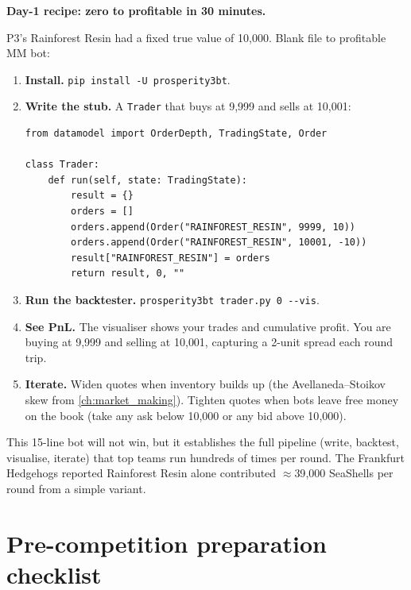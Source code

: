 \begin{prosperitybox}
\textbf{Day-1 recipe: zero to profitable in 30 minutes.}

P3's Rainforest Resin had a fixed true value of 10{,}000.  Blank file
to profitable MM bot:

\begin{enumerate}
  \item \textbf{Install.} \texttt{pip install -U prosperity3bt}.
  \item \textbf{Write the stub.}  A \texttt{Trader} that buys at 9{,}999
  and sells at 10{,}001:
\begin{lstlisting}[numbers=none, frame=none,
  backgroundcolor=\color{orange!5}]
from datamodel import OrderDepth, TradingState, Order

class Trader:
    def run(self, state: TradingState):
        result = {}
        orders = []
        orders.append(Order("RAINFOREST_RESIN", 9999, 10))
        orders.append(Order("RAINFOREST_RESIN", 10001, -10))
        result["RAINFOREST_RESIN"] = orders
        return result, 0, ""
\end{lstlisting}
  \item \textbf{Run the backtester.}
  \texttt{prosperity3bt trader.py 0 -{}-vis}.
  \item \textbf{See PnL.}  The visualiser shows your trades and
  cumulative profit.  You are buying at 9{,}999 and selling at
  10{,}001, capturing a 2-unit spread each round trip.
  \item \textbf{Iterate.}  Widen quotes when inventory builds up
  (the Avellaneda--Stoikov skew from \cref{ch:market_making}).
  Tighten quotes when bots leave free money on the book (take
  any ask below 10{,}000 or any bid above 10{,}000).
\end{enumerate}

This 15-line bot will not win, but it establishes the full
pipeline (write, backtest, visualise, iterate) that top teams run
hundreds of times per round.  The Frankfurt Hedgehogs reported
Rainforest Resin alone contributed $\approx$39{,}000 SeaShells per round
from a simple variant.
\end{prosperitybox}

\section{Pre-competition preparation checklist}
\label{sec:prosperity_prep}

